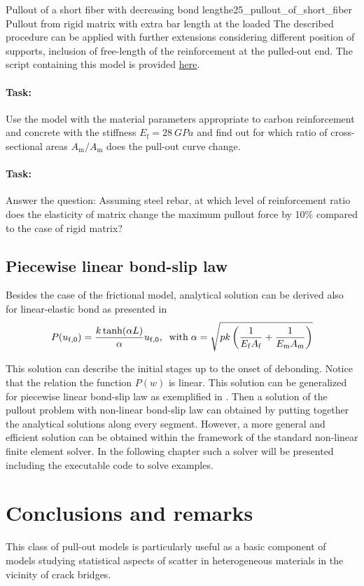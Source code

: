 \documentclass[main.tex]{subfiles}
\begin{document}
\begin{bmcsex}{Pullout of a short fiber with decreasing bond length}{e25_pullout_of_short_fiber}
Pullout from rigid matrix with extra bar length at the loaded 
The described procedure can be applied with further extensions considering different position of supports, inclusion of free-length of the reinforcement at the pulled-out end. The script containing this model is provided 
\href{http://localhost:8888/tree/Examples/2_5_Pullout_from_rigid_matrix_with_a_fiber_of_finite_length.ipynb}{here}.

\paragraph{Task:} Use the model with the material parameters appropriate to carbon reinforcement and concrete with the stiffness $E_\mathrm{f} = 28~GPa$ and find out for which ratio of cross-sectional areas $A_\mathrm{m}/A_\mathrm{m}$ 
does the pull-out curve change.
\paragraph{Task:} Answer the question: Assuming steel rebar, at which level of reinforcement ratio does the elasticity of matrix change the maximum pullout force by 10\% compared to the case of rigid matrix? 

\end{bmcsex}

\subsection{Piecewise linear bond-slip law}

Besides the case of the frictional model, analytical solution can be derived also for linear-elastic bond as presented in \cite{one}
\begin{align}
    \label{eq:linear_bond_analytical}
    P(u_{\mathrm{f},0}) = 
    \frac{k \tanh(\alpha L)}
    {\alpha}u_{\mathrm{f},0}, \;\; \mathrm{with}\;
    \alpha = \sqrt{ pk
    \left(
    \frac{1}{E_{\mathrm{f}} A_{\mathrm{f}}}
    +
    \frac{1}{E_{\mathrm{m}} A_{\mathrm{m}}}
    \right)}
\end{align}

This solution can describe the initial stages up to the onset of debonding.
Notice that the relation the function $P(w)$ is linear.
This solution can be generalized for piecewise linear bond-slip law as exemplified in \cite{yuan_full-range_2004}. Then a solution of the pullout problem with 
non-linear bond-slip law can obtained by putting together the analytical solutions 
along every segment. However, a more general and efficient solution can be obtained
within the framework of the standard non-linear finite element solver. In the following 
chapter such a solver will be presented including the executable code to solve examples. 

\section{Conclusions and remarks}
This class of pull-out models is particularly useful as a basic component of models studying statistical 
aspects of scatter in heterogeneous materials in the vicinity of crack bridges.
\end{document}
